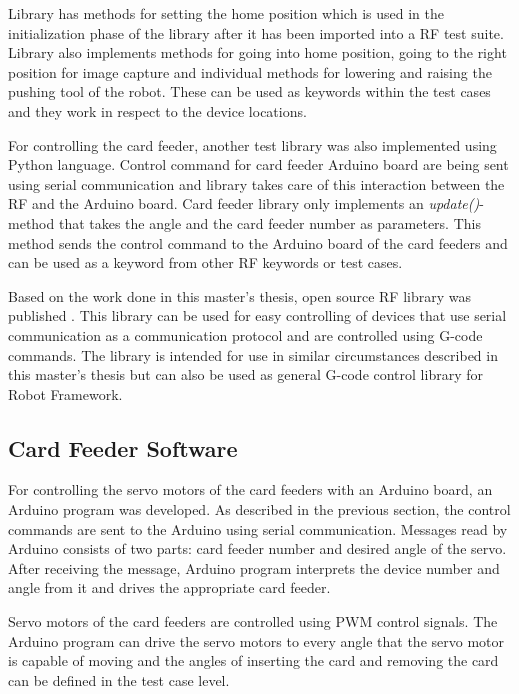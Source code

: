 Library has methods for setting the home position which is used in the initialization phase of the library after it has been imported into a RF test suite. Library also implements methods for going into home position, going to the right position for image capture and individual methods for lowering and raising the pushing tool of the robot. These can be used as keywords within the test cases and they work in respect to the device locations.

For controlling the card feeder, another test library was also implemented using Python language. Control command for card feeder Arduino board are being sent using serial communication and library takes care of this interaction between the RF and the Arduino board. Card feeder library only implements an \emph{update()}-method that takes the angle and the card feeder number as parameters. This method sends the control command to the Arduino board of the card feeders and can be used as a keyword from other RF keywords or test cases.

Based on the work done in this master's thesis, open source RF library was published \citep{cnc-library}. This library can be used for easy controlling of devices that use serial communication as a communication protocol and are controlled using G-code commands. The library is intended for use in similar circumstances described in this master's thesis but can also be used as general G-code control library for Robot Framework.

\subsection{Card Feeder Software}
\label{subsection:card feeder software}

For controlling the servo motors of the card feeders with an Arduino board, an Arduino program was developed. As described in the previous section, the control commands are sent to the Arduino using serial communication. Messages read by Arduino consists of two parts: card feeder number and desired angle of the servo. After receiving the message, Arduino program interprets the device number and angle from it and drives the appropriate card feeder. 

Servo motors of the card feeders are controlled using PWM control signals. The Arduino program can drive the servo motors to every angle that the servo motor is capable of moving and the angles of inserting the card and removing the card can be defined in the test case level.

